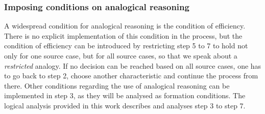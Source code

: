 		\subsubsection{Imposing conditions on analogical reasoning}\label{ConditionsAnalogicalReasoningCTT}

		A widespread condition for analogical reasoning is the condition of efficiency. There is no explicit implementation of this condition in the process, but the condition of efficiency can be introduced by restricting step 5 to 7 to hold not only for one source case, but for all source cases, so that we speak about a \textit{restricted} analogy. If no decision can be reached based on all source cases, one has to go back to step 2, choose another characteristic and continue the process from there. Other conditions regarding the use of analogical reasoning can be implemented in step 3, as they will be analysed as formation conditions. The logical analysis provided in this work describes and analyses step 3 to step 7. 
		
